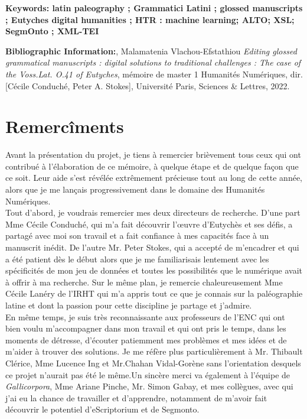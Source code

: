 \documentclass[a4paper, twoside, 12pt]{book}
\begin{document}
\medskip

\textbf{Keywords: latin paleography ; Grammatici Latini  ; glossed manuscripts ; Eutyches digital humanities ; HTR  : machine learning; ALTO; XSL; SegmOnto ; XML-TEI }

\textbf{Bibliographic Information:}, Malamatenia Vlachou-Efstathiou \textit{Editing glossed grammatical manuscripts : digital solutions to traditional challenges : The case of the \textit{Voss.Lat. O.41} of Eutyches}, mémoire de master 1 \og Humanités Numériques\fg{}, dir. [Cécile Conduché, Peter A. Stokes], Université Paris, Sciences \& Lettres, 2022.

\clearpage

\section*{Remercîments}

Avant la présentation du projet, je tiens à remercier brièvement tous ceux qui ont contribué à l'élaboration de ce mémoire, à quelque étape et de quelque façon que ce soit. Leur aide s'est révélée extrêmement précieuse tout au long de cette année, alors que je me lançais progressivement dans le domaine des Humanités Numériques.\\

Tout d'abord, je voudrais remercier mes deux directeurs de recherche. D’une part Mme Cécile Conduché, qui m'a fait découvrir l'œuvre d'Eutychès et ses défis, a partagé avec moi son travail et a fait confiance à mes capacités face à un manuscrit inédit. De l’autre Mr. Peter Stokes, qui a accepté de m'encadrer et qui a été patient dès le début alors que je me familiarisais lentement avec les spécificités de mon jeu de données et toutes les possibilités que le numérique avait à offrir à ma recherche. Sur le même plan, je remercie chaleureusement Mme Cécile Lanéry de l'IRHT qui m'a appris tout ce que je connais sur la paléographie latine et dont la passion pour cette discipline je partage et j’admire. \\

 En même temps, je suis très reconnaissante aux professeurs de l'ENC qui ont bien voulu m'accompagner dans mon travail et qui ont pris le temps, dans les moments de détresse, d'écouter patiemment mes problèmes et mes idées et de m'aider à trouver des solutions. Je me réfère plus particulièrement à Mr. Thibault Clérice, Mme Lucence Ing et Mr.Chahan Vidal-Gorène sans l'orientation desquels ce projet n'aurait pas été le même.Un sincère merci va également à l'équipe de \textit{Gallicorpora}, Mme Ariane Pinche, Mr. Simon Gabay, et mes collègues, avec qui j'ai eu la chance de travailler et d'apprendre, notamment de m'avoir fait découvrir le potentiel d'eScriptorium et de Segmonto. \\
\end{document}
